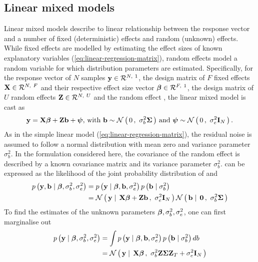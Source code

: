 \subsection{Linear mixed models}
\label{subsection:lmm}
Linear mixed models describe to linear relationship between the response vector and a number of fixed (deterministic) effects and random (unknown) effects. While fixed effects are modelled by estimating the effect sizes of known explanatory variables (\cref{eq:linear-regression-matrix}), random effects model a random variable for which distribution parameters are estimated. Specifically, for the response vector of \(N\) samples \(\boldsymbol{\mathbf{y}} \in \mathcal{R}^{N,~1}\), the design matrix of \(F\) fixed effects \(\boldsymbol{\mathbf{X}} \in \mathcal{R}^{N,~F}\) and their respective effect size vector \(\boldsymbol{\mathbf{\beta}} \in \mathcal{R}^{F,~1}\), the design matrix of \(U\) random effects \(\boldsymbol{\mathbf{Z}} \in \mathcal{R}^{N,~U}\) and the random effect , the linear mixed model is cast as
%
\begin{equation}
\boldsymbol{\mathbf{y}} =\boldsymbol{\mathbf{X}}\boldsymbol{\mathbf{\beta}} +\boldsymbol{\mathbf{Z}}\boldsymbol{\mathbf{b}}+\boldsymbol{\mathbf{\psi}},\, \text{with } \boldsymbol{\mathbf{b}} \sim \mathcal{N}\left(\,{0}\,,~{\sigma_b^2\boldsymbol{\mathbf{\Sigma}}}\,\right)\,\text{and  }\boldsymbol{\mathbf{\psi}} \sim\mathcal{N}\left(\,{0}\,,~{\sigma_e^2\boldsymbol{\mathbf{I}}_N}\,\right).
\label{eq:lmm}
\end{equation}
%
As in the simple linear model (\cref{eq:linear-regression-matrix}), the residual noise is assumed to follow a normal distribution with mean zero and variance parameter \(\sigma_b^2\). In the formulation considered here, the covariance of the random effect is described by a known covariance matrix \tmat{\Sigma} and its variance parameter \(\sigma_b^2\). 
%
 can be expressed as the likelihood  of the joint probability distribution of  and 
\begin{align}
p\left(\boldsymbol{\mathbf{y}}, \boldsymbol{\mathbf{b}}\mid \boldsymbol{\mathbf{\beta}},\sigma_b^2, \sigma_e^2\right) &= p\left(\boldsymbol{\mathbf{y}} \mid \boldsymbol{\mathbf{\beta}}, \boldsymbol{\mathbf{b}}, \sigma_e^2\right)p\left(\boldsymbol{\mathbf{b}}\mid \sigma_b^2\right) \label{eq:lmm-prob} \\
&= \mathcal{N}\left(\,{\boldsymbol{\mathbf{y}} \mid \, \boldsymbol{\mathbf{X\beta}} + \boldsymbol{\mathbf{Zb}}}\,,~{\sigma_e^2\boldsymbol{\mathbf{I}}_{N}}\,\right) \mathcal{N}\left(\,{\boldsymbol{\mathbf{b}} \mid \,\boldsymbol{\mathbf{0}}}\,,~{\sigma_b^2\boldsymbol{\mathbf{\Sigma}}}\,\right)\label{eq:lmm-norm}
\end{align}
%
To find the estimates of the unknown parameters \(\boldsymbol{\mathbf{\beta}}, \sigma_b^2, \sigma_e^2\), one can first marginalise out  
%
\begin{align}
p\left(\boldsymbol{\mathbf{y}} \mid \boldsymbol{\mathbf{\beta}},\sigma_b^2, \sigma_e^2\right) &= \int p\left(\boldsymbol{\mathbf{y}} \mid \boldsymbol{\mathbf{\beta}}, \boldsymbol{\mathbf{b}}, \sigma_e^2\right)p\left(\boldsymbol{\mathbf{b}}\mid \sigma_b^2\right) db \label{eq:lmm-marginal-prob} \\
&= \mathcal{N}\left(\,{\boldsymbol{\mathbf{y}} \mid  \, \boldsymbol{\mathbf{X\beta}}}\,,~{\sigma_b^2\boldsymbol{\mathbf{Z}}\boldsymbol{\mathbf{\Sigma}}\boldsymbol{\mathbf{Z}}_{T} + \sigma_e^2\boldsymbol{\mathbf{I}}_{N}}\,\right)  \label{eq:lmm-marginal-norm} 
\end{align}
